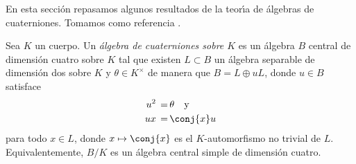 % 
% 

En esta secci\'{o}n repasamos algunos resultados de la teor\'{\i}a de
\'{a}lgebras de cuaterniones. Tomamos como referencia \cite{Vigneras}.

Sea $K$ un cuerpo. Un \emph{\'{a}lgebra de cuaterniones sobre $K$} es un
\'{a}lgebra $B$ central de dimensi\'{o}n cuatro sobre $K$ tal que existen
$L\subset B$ un \'{a}lgebra separable de dimensi\'{o}n dos sobre $K$ y
$\theta\in K^{\times}$ de manera que $B=L\oplus uL$, donde $u\in B$ satisface
\begin{align*}
 u^{2} \,=\, & \theta\quad\text{y} \\
 ux \,=\, & \conj{x}u
\end{align*}
%
para todo $x\in L$, donde $x\mapsto \conj{x}$ es el $K$-automorfismo
no trivial de $L$. Equivalentemente, $B/K$ es un \'{a}lgebra central simple
de dimensi\'{o}n cuatro.

